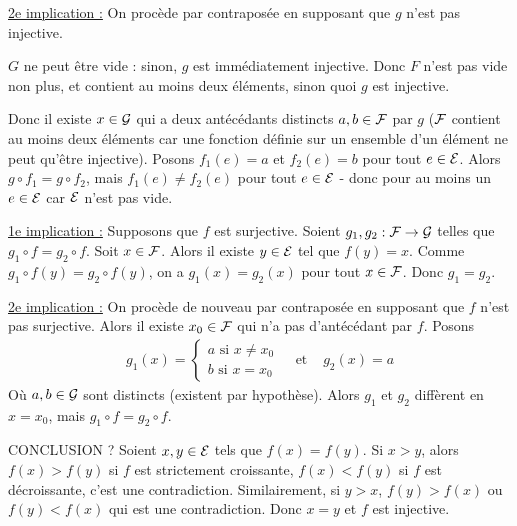 \documentclass[]{../templates/homework}
\begin{document}
\underline{2e implication :} On procède par contraposée en supposant que $g$ n'est pas injective.

$G$ ne peut être vide : sinon, $g$ est immédiatement injective. Donc $F$ n'est pas vide non plus, et contient au moins deux éléments, sinon quoi $g$ est injective.

Donc il existe $x\in\mathcal G$ qui a deux antécédants distincts $a,b\in\mathcal F$ par $g$ ($\mathcal F$ contient au moins deux éléments car une fonction définie sur un ensemble d'un élément ne peut qu'être injective). Posons $f_{1}(e) = a$ et $f_{2}(e) = b$ pour tout $e\in\mathcal E$. Alors $g\circ f_{1} = g\circ f_{2}$, mais $f_{1}(e) \neq f_{2}(e)$ pour tout $e\in\mathcal E$ - donc pour au moins un $e\in\mathcal E$ car $\mathcal E$ n'est pas vide.

\question
\underline{1e implication :} Supposons que $f$ est surjective. Soient $g_{1},g_{2}: \mathcal F\rightarrow \mathcal G$ telles que $g_{1}\circ f = g_{2}\circ f$. Soit $x \in \mathcal F$. Alors il existe $y\in\mathcal E$ tel que $f(y) = x$. Comme $g_{1}\circ f(y) = g_{2}\circ f(y)$, on a $g_{1}(x) = g_{2}(x)$ pour tout $x\in\mathcal F$. Donc $g_{1} = g_{2}$.

\underline{2e implication :} On procède de nouveau par contraposée en supposant que $f$ n'est pas surjective. Alors il existe $x_{0}\in\mathcal F$ qui n'a pas d'antécédant par $f$. Posons
\begin{eqnarray}
  g_{1}(x) =
  \begin{cases}
    a \text{ si } x\neq x_{0} \\
    b \text{ si } x = x_{0}
  \end{cases}
  &\text{  et  }& g_{2}(x) = a
\end{eqnarray}
Où $a,b \in\mathcal G$ sont distincts (existent par hypothèse). Alors $g_{1}$ et $g_{2}$ diffèrent en $x=x_{0}$, mais $g_{1}\circ f = g_{2}\circ f$.

CONCLUSION ?
\subproblem
Soient $x,y \in \mathcal E$ tels que $f(x) = f(y)$. Si $x>y$, alors $f(x) > f(y)$ si $f$ est strictement croissante, $f(x) < f(y)$ si $f$ est décroissante, c'est une contradiction. Similairement, si $y>x$, $f(y) > f(x)$ ou $f(y) < f(x)$ qui est une contradiction. Donc $x=y$ et $f$ est injective.
\end{document}
